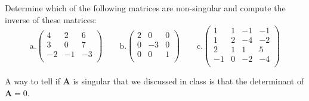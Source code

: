 \documentclass[12pt, answers]{exam}
\newcommand{\ve}[1]{\ensuremath{\mathbf{#1}}}
\begin{document}
\begin{questions}

\addpoints
\question[10] 
Determine which of the following matrices are non-singular and compute the inverse of these matrices:
\newcommand{\aaa}{4}
\newcommand{\aab}{2}
\newcommand{\aac}{6}
\newcommand{\aba}{3}
\newcommand{\abb}{0}
\newcommand{\abc}{7}
\newcommand{\aca}{-2}
\newcommand{\acb}{-1}
\newcommand{\acc}{-3}
\newcommand{\baa}{2}
\newcommand{\bab}{0}
\newcommand{\bac}{0}
\newcommand{\bba}{0}
\newcommand{\bbb}{-3}
\newcommand{\bbc}{0}
\newcommand{\bca}{0}
\newcommand{\bcb}{0}
\newcommand{\bcc}{1}
\newcommand{\caa}{1}
\newcommand{\cab}{1}
\newcommand{\cac}{-1}
\newcommand{\cad}{-1}
\newcommand{\cba}{1}
\newcommand{\cbb}{2}
\newcommand{\cbc}{-4}
\newcommand{\cbd}{-2}
\newcommand{\cca}{2}
\newcommand{\ccb}{1}
\newcommand{\ccc}{1}
\newcommand{\ccd}{5}
\newcommand{\cda}{-1}
\newcommand{\cdb}{0}
\newcommand{\cdc}{-2}
\newcommand{\cdd}{-4}
\begin{equation}
\text{a.} \begin{pmatrix}
   \aaa & \aab & \aac \\
   \aba & \abb & \abc \\
   \aca & \acb & \acc \\
\end{pmatrix} \qquad
%
\text{b.} \begin{pmatrix}
   \baa & \bab & \bac \\
   \bba & \bbb & \bbc \\
   \bca & \bcb & \bcc \\
\end{pmatrix} \qquad
%
\text{c.} \begin{pmatrix}
  \caa & \cab & \cac & \cad \\
  \cba & \cbb & \cbc & \cbd \\
  \cca & \ccb & \ccc & \ccd \\
  \cda & \cdb & \cdc & \cdd \\
\end{pmatrix} \nonumber
\end{equation}

\begin{solution}
A way to tell if $\ve{A}$ is singular that we discussed in class is that the determinant of $\ve{A}=0$.

\begin{parts}

\end{parts}
\end{solution}
\end{questions}
\end{document}
